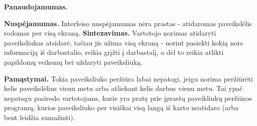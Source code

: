 ﻿\documentclass[a4paper, 12pt]{article}
\begin{document}
		\textbf{Panaudojamumas.}

		\textbf{Nuspėjamumas.}
		Interfeiso nuspėjamumas nėra prastas - atidaromas paveikslėlis rodomas per visą ekraną.
		\textbf{Sintezavimas.}
		Vartotojo norimas atidaryti paveiksliukas atsidarė, tačiau jis užima visą ekraną - norint pasiekti kokią nors informaciją iš darbastalio, reikia grįžti į darbastalį, o dėl to reikia atlikti papildomų veiksmų bei uždaryti paveiksliuką.

		\textbf{Pamąstymai.}
		Tokia paveiksliuko peržiūra labai nepatogi, jeigu norima peržiūrėti kelis paveikslėlius vienu metu arba atliekant kelis darbus vienu metu.
		Tai ypač nepatogu pasirodo vartotojams, kurie yra pratę prie įprastų paveikliukų peržiūros programų, kurios paveiksliuko per visiškai visą langą iš karto neatidaro (arba bent leidžia sumažinti).
\end{document}
